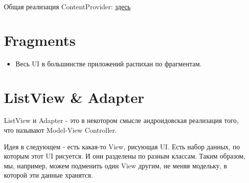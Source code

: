\documentclass[12 pt]{article}
\begin{document}
    Общая реализация ContentProvider:  
   \href{https://github.com/krinkinmu/forecast/blob/master/app/src/main/java/edu/spbau/android/forecast/WeatherProvider.java}{здесь} 

\section{Fragments}
    \begin{itemize}
        \item Весь UI в большинстве приложений распихан по фрагментам.
    \end{itemize}
\section{ListView \& Adapter}   
    ListView и Adapter - это в некотором смысле андроидовская реализация того, что называют Model-View Controller.
    
    Идея в следующем - есть какая-то View, рисующая UI. Есть набор данных, по которым этот UI рисуется. И они разделены по разным классам. Таким образом, мы, например, можем подменить один View другим, не меняя модельку, в которой эти данные хранятся.
\end{document}

